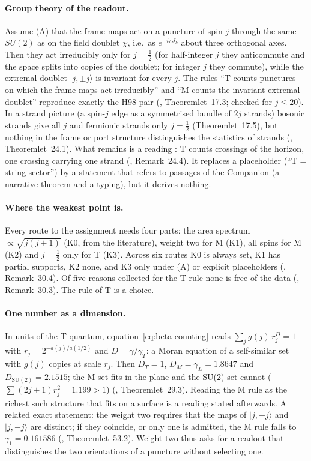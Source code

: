 \paragraph{Group theory of the readout.}
Assume (A) that the frame maps act on a puncture of spin $j$ through the same $SU(2)$ as on the field doublet $\chi$, i.e.\ as $e^{-i\pi J_k}$ about
three orthogonal axes.  Then they act irreducibly only for $j=\tfrac12$ (for half-integer $j$ they anticommute and the space splits into copies of
the doublet; for integer $j$ they commute), while the extremal doublet $|j,\pm j\rangle$ is invariant for every $j$.  The rules ``T counts punctures
on which the frame maps act irreducibly'' and ``M counts the invariant extremal doublet'' reproduce exactly the H98 pair (,
Theoremlet~17.3; checked for $j\le20$).  In a strand picture (a spin-$j$ edge as a symmetrised bundle of $2j$ strands) bosonic strands give all $j$ and
fermionic strands only $j=\tfrac12$ (Theoremlet~17.5), but nothing in the frame or port structure distinguishes the statistics of strands
(, Theoremlet~24.1).  What remains is a reading \Reading: T counts crossings of the horizon, one crossing carrying one strand
(, Remark~24.4).  It replaces a placeholder (``T = string sector'') by a statement that refers to passages of the Companion (a narrative theorem and a typing), but it derives nothing.

\paragraph{Where the weakest point is.}
Every route to the assignment needs four parts: the area spectrum $\propto\sqrt{j(j+1)}$ (K0, from the literature), weight two for M (K1), all spins
for M (K2) and $j=\tfrac12$ only for T (K3).  Across six routes K0 is always set, K1 has partial supports, K2 none, and K3 only under (A) or explicit
placeholders (, Remark~30.4).  Of five reasons collected for the T rule none is free of the data (, Remark~30.3).  The rule of T
is a choice.

\paragraph{One number as a dimension.}
In units of the T quantum, equation~\eqref{eq:beta-counting} reads $\sum_j g(j)\,r_j^{D}=1$ with $r_j=2^{-a(j)/a(1/2)}$ and $D=\gamma/\gamma_T$: a
Moran equation of a self-similar set with $g(j)$ copies at scale $r_j$.  Then $D_T=1$, $D_M=\gamma_L=1.8647$ and $D_{\mathrm{SU(2)}}=2.1515$; the M set
fits in the plane and the SU(2) set cannot ($\sum(2j+1)r_j^2=1.199>1$) (, Theoremlet~29.3).  Reading the M rule as the richest such structure that fits on a surface is a reading stated afterwards.  A related exact statement: the weight two requires that the maps of $|j,+j\rangle$ and $|j,-j\rangle$
are distinct; if they coincide, or only one is admitted, the M rule falls to $\gamma_1=0.161586$ (, Theoremlet~53.2).  Weight two thus
asks for a readout that distinguishes the two orientations of a puncture without selecting one.

